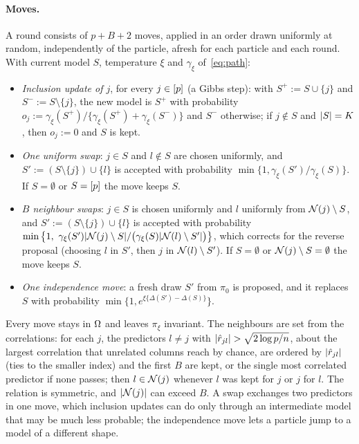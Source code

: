 \paragraph{Moves.} A round consists of $p+B+2$ moves, applied in an order drawn uniformly at random, independently of
the particle, afresh for each particle and each round. With current model $S$, temperature $\xi$ and
$\gamma_\xi$ of~\eqref{eq:path}:
\begin{itemize}
  \item \emph{Inclusion update of $j$}, for every $j\in[p]$ (a Gibbs step): with $S^+:=S\cup\{j\}$ and
    $S^-:=S\setminus\{j\}$, the new model is $S^+$ with probability
    $o_j:=\gamma_\xi(S^+)/\{\gamma_\xi(S^+)+\gamma_\xi(S^-)\}$ and $S^-$ otherwise; if $j\notin S$ and $\lvert S\rvert=K$,
    then $o_j:=0$ and $S$ is kept.
  \item \emph{One uniform swap}: $j\in S$ and $l\notin S$ are chosen uniformly, and $S':=(S\setminus\{j\})\cup\{l\}$
    is accepted with probability $\min\{1,\gamma_\xi(S')/\gamma_\xi(S)\}$. If $S=\emptyset$ or $S=[p]$ the move
    keeps $S$.
  \item \emph{$B$ neighbour swaps}: $j\in S$ is chosen uniformly and $l$ uniformly from $\mathcal N(j)\setminus S$, and
    $S':=(S\setminus\{j\})\cup\{l\}$ is accepted with probability
    $\min\big\{1,\ \gamma_\xi(S')\abs{\Nb(j)\setminus S}/\big(\gamma_\xi(S)\abs{\Nb(l)\setminus S'}\big)\big\}$, which
    corrects for the reverse proposal (choosing $l$ in $S'$, then $j$ in $\mathcal N(l)\setminus S'$). If $S=\emptyset$ or
    $\mathcal N(j)\setminus S=\emptyset$ the move keeps $S$.
  \item \emph{One independence move}: a fresh draw $S'$ from $\pi_0$ is proposed, and it replaces $S$ with
    probability $\min\{1,e^{\xi\{\Delta(S')-\Delta(S)\}}\}$.
\end{itemize}
Every move stays in $\Omega$ and leaves $\pi_\xi$ invariant. The neighbours are set from the correlations: for each $j$,
the predictors $l\neq j$ with $\lvert \hat r_{jl}\rvert>\sqrt{2\log p/n}$, about the largest correlation that unrelated
columns reach by chance, are ordered by $\lvert \hat r_{jl}\rvert$ (ties to the smaller index) and the first $B$ are kept,
or the single most correlated predictor if none passes; then $l\in\mathcal N(j)$ whenever $l$ was kept for $j$ or $j$ for
$l$. The relation is symmetric, and $\lvert \mathcal N(j)\rvert$ can exceed $B$. A swap exchanges two predictors in one move, which
inclusion updates can do only through an intermediate model that may be much less probable; the independence move
lets a particle jump to a model of a different shape.

